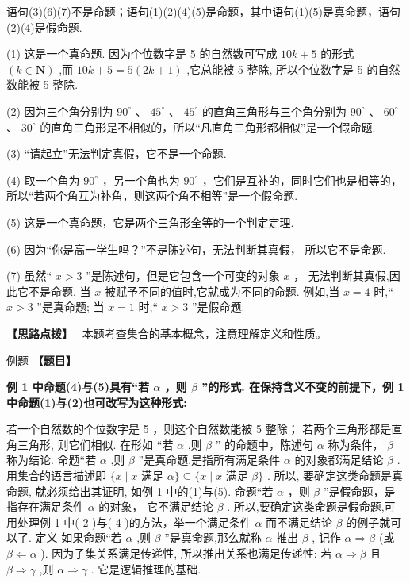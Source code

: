 \documentclass[a4paper,10pt,oneside,fontset=none]{ctexbook}
\newcounter{example}[chapter]
\newenvironment{example}[1][]{\begin{exBox}{例题}{#1}}{\end{exBox}}
\numberwithin{equation}{chapter}
\newenvironment{solution}{\begin{solutionBox}}{\end{solutionBox}}
\newenvironment{hint}{\begin{hintBox}\textbf{【思路点拨】}~}{\end{hintBox}}
\begin{document}
\begin{solution}
语句(3)(6)(7)不是命题；语句(1)(2)(4)(5)是命题，其中语句(1)(5)是真命题，语句(2)(4)是假命题.
\par
(1) 这是一个真命题. 因为个位数字是 5 的自然数可写成 ${10k} + 5$ 的形式 $\left( {k \in  \mathbf{N}}\right)$ ,而 ${10k} + 5 = 5\left( {{2k} + 1}\right)$ ,它总能被 5 整除, 所以个位数字是 5 的自然数能被 5 整除.
\par
(2) 因为三个角分别为 ${90}^{ \circ  }$ 、 ${45}^{ \circ  }$ 、 ${45}^{ \circ  }$ 的直角三角形与三个角分别为 ${90}^{ \circ  }$ 、 ${60}^{ \circ  }$ 、 ${30}^{ \circ  }$ 的直角三角形是不相似的，所以“凡直角三角形都相似”是一个假命题.
\par
(3) “请起立”无法判定真假，它不是一个命题.
\par
(4) 取一个角为 ${90}^{ \circ  }$ ，另一个角也为 ${90}^{ \circ  }$ ，它们是互补的，同时它们也是相等的，所以“若两个角互为补角，则这两个角不相等”是一个假命题.
\par
(5) 这是一个真命题，它是两个三角形全等的一个判定定理.
\par
(6) 因为“你是高一学生吗？”不是陈述句，无法判断其真假， 所以它不是命题.
\par
(7) 虽然“ $x > 3$ ”是陈述句，但是它包含一个可变的对象 $x$ ， 无法判断其真假,因此它不是命题. 当 $x$ 被赋予不同的值时,它就成为不同的命题. 例如,当 $x = 4$ 时,“ $x > 3$ ”是真命题; 当 $x = 1$ 时,“ $x > 3$ ”是假命题.
\end{solution}

\begin{hint}
本题考查集合的基本概念，注意理解定义和性质。
\end{hint}

\begin{example}
\textbf{【题目】}\par\vspace{0.3em}
\textbf{例 1 中命题(4)与(5)具有“若 $\alpha$ ，则 $\beta$ ”的形式. 在保持含义不变的前提下，例 1 中命题(1)与(2)也可改写为这种形式:}\par\vspace{0.3em}
若一个自然数的个位数字是 5 ，则这个自然数能被 5 整除；
若两个三角形都是直角三角形, 则它们相似.
在形如
“若 $\alpha$ ,则 $\beta$ ”
的命题中，陈述句 $\alpha$ 称为条件， $\beta$ 称为结论.
命题“若 $\alpha$ ,则 $\beta$ ”是真命题,是指所有满足条件 $\alpha$ 的对象都满足结论 $\beta$ . 用集合的语言描述即
$\{ x \mid  x$ 满足 $\alpha \}  \subseteq  \{ x \mid  x$ 满足 $\beta \}$ .
所以, 要确定这类命题是真命题, 就必须给出其证明, 如例 1 中的(1)与(5).
命题“若 $\alpha$ ，则 $\beta$ ”是假命题，是指存在满足条件 $\alpha$ 的对象， 它不满足结论 $\beta$ . 所以,要确定这类命题是假命题,可用处理例 1 中( 2 )与( 4 )的方法，举一个满足条件 $\alpha$ 而不满足结论 $\beta$ 的例子就可以了.
定义 如果命题“若 $\alpha$ ,则 $\beta$ ”是真命题,那么就称 $\alpha$ 推出 $\beta$ , 记作 $\alpha  \Rightarrow  \beta$ (或 $\beta  \Leftarrow  \alpha$ ).
因为子集关系满足传递性, 所以推出关系也满足传递性:
若 $\alpha  \Rightarrow  \beta$ 且 $\beta  \Rightarrow  \gamma$ ,则 $\alpha  \Rightarrow  \gamma$ .
它是逻辑推理的基础.
\end{example}
\end{document}
